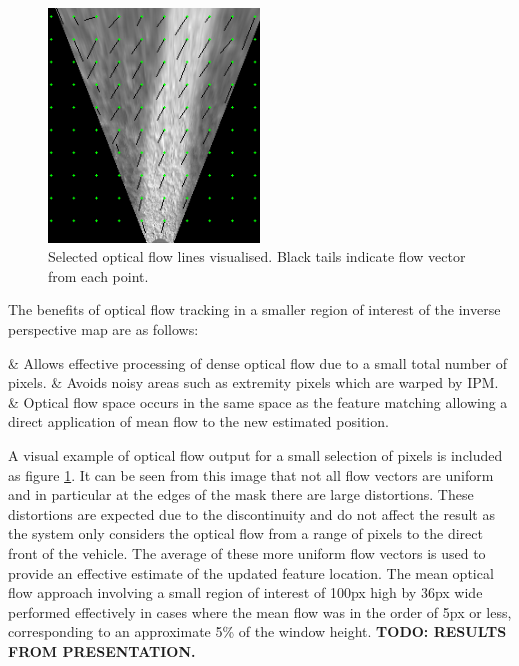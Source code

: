 \documentclass[]{aiaa-tc}%
\begin{document}
\begin{figure} %
	\centering
	\includegraphics[width=0.5\textwidth]{FeatureTracking/optical_flow_trails.png}
	\caption{Selected optical flow lines visualised. Black tails indicate flow vector from each point.}
	\label{f:optical_flow_trails}
\end{figure}

The benefits of optical flow tracking in a smaller region of interest of the inverse perspective map are as follows:
\begin{easylist}
	& Allows effective processing of dense optical flow due to a small total number of pixels.
	& Avoids noisy areas such as extremity pixels which are warped by IPM.
	& Optical flow space occurs in the same space as the feature matching allowing a direct application of mean flow to the new estimated position.
\end{easylist}

A visual example of optical flow output for a small selection of pixels is included as figure \ref{f:optical_flow_trails}. It can be seen from this image that not all flow vectors are uniform and in particular at the edges of the mask there are large distortions. These distortions are expected due to the discontinuity and do not affect the result as the system only considers the optical flow from a range of pixels to the direct front of the vehicle. The average of these more uniform flow vectors is used to provide an effective estimate of the updated feature location. The mean optical flow approach involving a small region of interest of 100px high by 36px wide performed effectively in cases where the mean flow was in the order of 5px or less, corresponding to an approximate 5\% of the window height. \textbf{TODO: RESULTS FROM PRESENTATION.}
\end{document}
